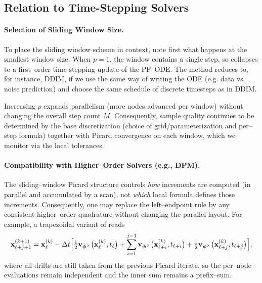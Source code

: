 \subsection{Relation to Time-Stepping Solvers}

\paragraph{Selection of Sliding Window Size.}

To place the sliding window scheme in context, note first what happens at the
smallest window size. When $p=1$, the window contains a single step, so
 collapses to a first–order time-stepping update of the
PF–ODE. The method reduces to, for instance, DDIM, if we use the same way of writing the ODE (e.g. data vs. noise prediction) and choose the same schedule of discrete timesteps as in DDIM.

Increasing $p$ expands parallelism (more nodes advanced per window) without
changing the overall step count $M$. Consequently, sample quality continues to
be determined by the base discretization (choice of grid/parameterization
and per–step formula) together with Picard convergence on each window,
which we monitor via the local tolerances. 

\paragraph{Compatibility with Higher–Order Solvers (e.g., DPM).}
The sliding–window Picard structure controls \emph{how} increments are computed
(in parallel and accumulated by a scan), not \emph{which} local formula defines
those increments. Consequently, one may replace the left–endpoint rule by any
consistent higher–order quadrature without changing the parallel
layout. For example, a trapezoidal variant of  reads
\begin{align*}
    \begin{aligned}
        {\mathbf{x}}^{(k+1)}_{\ell+j+1}
=
{\mathbf{x}}^{(k)}_{\ell}
-\Delta t \Big[
\tfrac{1}{2}{\mathbf{v}}_{{\bm{\phi}}^\times} \big({\mathbf{x}}^{(k)}_{\ell},t_{\ell}\big)
+\sum_{i=1}^{j-1}{\mathbf{v}}_{{\bm{\phi}}^\times} \big({\mathbf{x}}^{(k)}_{\ell+i},t_{\ell+i}\big)
+\tfrac{1}{2}{\mathbf{v}}_{{\bm{\phi}}^\times} \big({\mathbf{x}}^{(k)}_{\ell+j},t_{\ell+j}\big)
\Big],
    \end{aligned}
\end{align*}
where all drifts are still taken from the previous Picard iterate, so
the per–node evaluations remain independent and the inner sum remains a prefix–sum.

